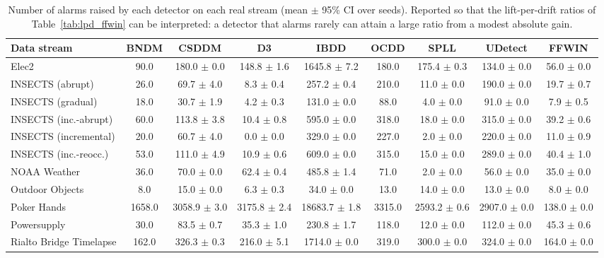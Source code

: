 \begin{table}[!t]
\centering
\caption{Number of alarms raised by each detector on each real stream (mean $\pm$ 95\% CI over seeds). Reported so that the lift-per-drift ratios of Table~\ref{tab:lpd_ffwin} can be interpreted: a detector that alarms rarely can attain a large ratio from a modest absolute gain.}
\label{tab:alarm_counts}
\footnotesize
\setlength{\tabcolsep}{4pt}
\begin{tabular}{@{}lcccccccc@{}}
\toprule
\textbf{Data stream} & \textbf{BNDM} & \textbf{CSDDM} & \textbf{D3} & \textbf{IBDD} & \textbf{OCDD} & \textbf{SPLL} & \textbf{UDetect} & \textbf{FFWIN} \\
\midrule
Elec2 & 90.0 & 180.0 $\pm$ 0.0 & 148.8 $\pm$ 1.6 & 1645.8 $\pm$ 7.2 & 180.0 & 175.4 $\pm$ 0.3 & 134.0 $\pm$ 0.0 & 56.0 $\pm$ 0.0 \\
INSECTS (abrupt) & 26.0 & 69.7 $\pm$ 4.0 & 8.3 $\pm$ 0.4 & 257.2 $\pm$ 0.4 & 210.0 & 11.0 $\pm$ 0.0 & 190.0 $\pm$ 0.0 & 19.7 $\pm$ 0.7 \\
INSECTS (gradual) & 18.0 & 30.7 $\pm$ 1.9 & 4.2 $\pm$ 0.3 & 131.0 $\pm$ 0.0 & 88.0 & 4.0 $\pm$ 0.0 & 91.0 $\pm$ 0.0 & 7.9 $\pm$ 0.5 \\
INSECTS (inc.-abrupt) & 60.0 & 113.8 $\pm$ 3.8 & 10.4 $\pm$ 0.8 & 595.0 $\pm$ 0.0 & 318.0 & 18.0 $\pm$ 0.0 & 315.0 $\pm$ 0.0 & 39.2 $\pm$ 0.6 \\
INSECTS (incremental) & 20.0 & 60.7 $\pm$ 4.0 & 0.0 $\pm$ 0.0 & 329.0 $\pm$ 0.0 & 227.0 & 2.0 $\pm$ 0.0 & 220.0 $\pm$ 0.0 & 11.0 $\pm$ 0.9 \\
INSECTS (inc.-reocc.) & 53.0 & 111.0 $\pm$ 4.9 & 10.9 $\pm$ 0.6 & 609.0 $\pm$ 0.0 & 315.0 & 15.0 $\pm$ 0.0 & 289.0 $\pm$ 0.0 & 40.4 $\pm$ 1.0 \\
NOAA Weather & 36.0 & 70.0 $\pm$ 0.0 & 62.4 $\pm$ 0.4 & 485.8 $\pm$ 1.4 & 71.0 & 2.0 $\pm$ 0.0 & 56.0 $\pm$ 0.0 & 35.0 $\pm$ 0.0 \\
Outdoor Objects & 8.0 & 15.0 $\pm$ 0.0 & 6.3 $\pm$ 0.3 & 34.0 $\pm$ 0.0 & 13.0 & 14.0 $\pm$ 0.0 & 13.0 $\pm$ 0.0 & 8.0 $\pm$ 0.0 \\
Poker Hands & 1658.0 & 3058.9 $\pm$ 3.0 & 3175.8 $\pm$ 2.4 & 18683.7 $\pm$ 1.8 & 3315.0 & 2593.2 $\pm$ 0.6 & 2907.0 $\pm$ 0.0 & 138.0 $\pm$ 0.0 \\
Powersupply & 30.0 & 83.5 $\pm$ 0.7 & 35.3 $\pm$ 1.0 & 230.8 $\pm$ 1.7 & 118.0 & 12.0 $\pm$ 0.0 & 112.0 $\pm$ 0.0 & 45.3 $\pm$ 0.6 \\
Rialto Bridge Timelapse & 162.0 & 326.3 $\pm$ 0.3 & 216.0 $\pm$ 5.1 & 1714.0 $\pm$ 0.0 & 319.0 & 300.0 $\pm$ 0.0 & 324.0 $\pm$ 0.0 & 164.0 $\pm$ 0.0 \\
\bottomrule
\end{tabular}
\end{table}
